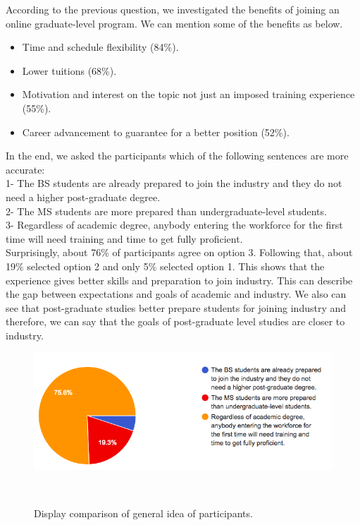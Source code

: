 \documentclass{sigchi}
\begin{document}
According to the previous question, we investigated the benefits of joining an online graduate-level program. We can mention some of the benefits as below.
\begin{itemize}
	\item Time and schedule flexibility (84\%).
	\item Lower tuitions (68\%).
	\item Motivation and interest on the topic not just an imposed training experience (55\%).
	\item Career advancement to guarantee for a better position (52\%).
\end{itemize}

In the end, we asked the participants which of the following sentences are more accurate:\\

1- The BS students are already prepared to join the industry and they do not need a higher post-graduate degree.\\
2- The MS students are more prepared than undergraduate-level students.\\
3- Regardless of academic degree, anybody entering the workforce for the first time will need training and time to get fully proficient.\\

Surprisingly, about 76\% of participants agree on option 3. Following that, about 19\% selected option 2 and only 5\% selected option 1. This shows that the experience gives better skills and preparation to join industry. This can describe the gap between expectations and goals of academic and industry. We also can see that post-graduate studies better prepare students for joining industry and therefore, we can say that the goals of post-graduate level studies are closer to industry.

\begin{figure}
\centering
  \includegraphics[width=1.05\columnwidth]{figures/general_accurate_sentence}
  \caption{Display comparison of general idea of participants.}~\label{fig:figure 8}
\end{figure}
\end{document}
